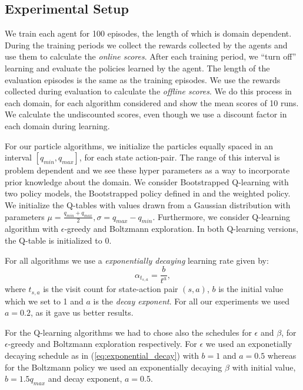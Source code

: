 \subsection{Experimental Setup}
We train each agent for 100 episodes, the length of which is domain dependent. During the training periods we collect the rewards collected by the agents and use them to calculate the \emph{online scores}. After each training period, we ``turn off'' learning and evaluate the policies learned by the agent. The length of the evaluation episodes is the same as the training episodes. We use the rewards collected during evaluation to calculate the \emph{offline scores}. We do this process in each domain, for each algorithm considered and show the mean scores of 10 runs. We calculate the undiscounted scores, even though we use a discount factor in each domain during learning.\par
For our particle algorithms, we initialize the particles equally spaced in an interval $[q_{min}, q_{max}]$, for each state action-pair. The range of this interval is problem dependent and we see these hyper parameters as a way to incorporate prior knowledge about the domain. We consider Bootstrapped Q-learning with two policy models, the Bootstrapped policy defined in \cite{DBLP:journals/corr/OsbandBPR16} and the weighted policy. We initialize the Q-tables with values drawn from a Gaussian distribution with parameters $\mu=\frac{q_{min}+q_{max}}{2},\sigma=q_{max}-q_{min}$. Furthermore, we consider Q-learning algorithm with $\epsilon$-greedy and Boltzmann exploration. In both Q-learning versions, the Q-table is initialized to 0.\par
For all algorithms we use a \emph{exponentially decaying} learning rate given by:
\begin{equation}
\label{eq:exponential_decay}
\alpha_{t_{s,a}}=\frac{b}{t^{a}},
\end{equation}
where $t_{s,a}$ is the visit count for state-action pair $(s,a)$, $b$ is the initial value which we set to 1 and $a$ is the \emph{decay exponent}. For all our experiments we used $a=0.2$, as it gave us better results.\par
For the Q-learning algorithms we had to chose also the schedules for $\epsilon$ and $\beta$, for $\epsilon$-greedy and Boltzmann exploration respectively. For $\epsilon$ we used an exponetially decaying schedule as in (\ref{eq:exponential_decay}) with $b=1$ and $a=0.5$ whereas for the Boltzmann policy we used an exponentially decaying $\beta$ with initial value, $b=1.5q_{max}$ and decay exponent, $a=0.5$. 
